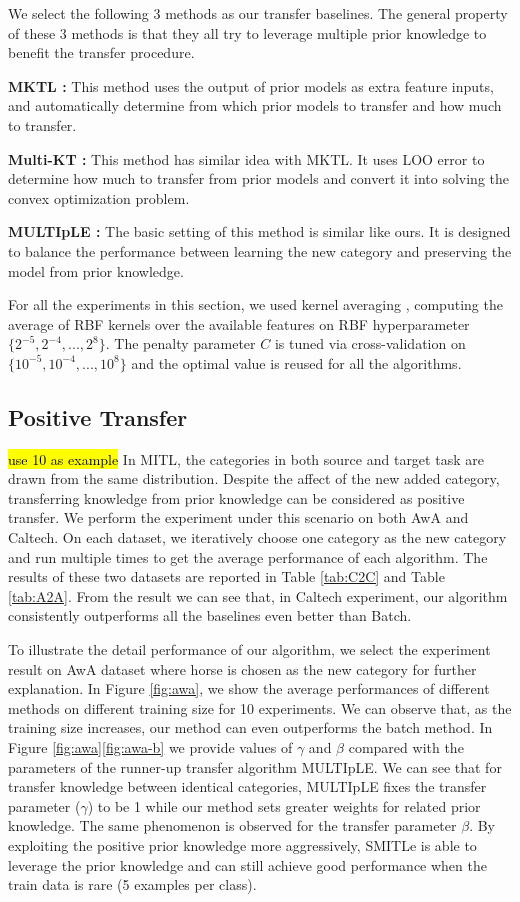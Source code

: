 We select the following 3 methods as our transfer baselines. The general property of these 3 methods is that they all try to leverage multiple prior knowledge to benefit the transfer procedure.

\textbf{MKTL \cite{jie2011multiclass}:} This method uses the output of prior models as extra feature inputs, and automatically determine from which prior models to transfer and how much to transfer.


\textbf{Multi-KT \cite{tommasi2014learning}:} This method has similar idea with MKTL. It uses LOO error to determine how much to transfer from prior models and convert it into solving the convex optimization problem.

\textbf{MULTIpLE \cite{kuzborskij2013n}:} The basic setting of this method is similar like ours. It is designed to balance the performance between learning the new category and preserving the model from prior knowledge.

For all the experiments in this section, we used kernel averaging \cite{gehler2009feature}, computing the average of RBF kernels over the available features on RBF hyperparameter $\{2^{-5},2^{-4},...,2^8\}$. The penalty parameter $C$ is tuned via cross-validation on $\{10^{-5},10^{-4},...,10^8\}$ and the optimal value is reused for all the algorithms.

\subsection{Positive Transfer}
\hl{use 10 as example}
In MITL, the categories in both source and target task are drawn from the same distribution. Despite the affect of the new added category, transferring knowledge from prior knowledge can be considered as positive transfer. We perform the experiment under this scenario on both AwA and Caltech. On each dataset, we iteratively choose one category as the new category and run multiple times to get the average performance of each algorithm. The results of these two datasets are reported in Table \ref{tab:C2C} and Table \ref{tab:A2A}. From the result we can see that, in Caltech experiment, our algorithm consistently outperforms all the baselines even better than Batch.

To illustrate the detail performance of our algorithm, we select the experiment result on AwA dataset where horse is chosen as the new category for further explanation. In Figure \ref{fig:awa}, we show the average performances of different methods on different training size for 10 experiments. We can observe that, as the training size increases, our method can even outperforms the batch method.
In Figure \ref{fig:awa}\ref{fig:awa-b} we provide values of $\gamma$ and $\beta$ compared with the parameters of the runner-up transfer algorithm MULTIpLE. We can see that for transfer knowledge between identical categories, MULTIpLE fixes the transfer parameter ($\gamma$) to be 1 while our method sets greater weights for related prior knowledge. The same phenomenon is observed for the transfer parameter $\beta$. By exploiting the positive prior knowledge more aggressively, SMITLe is able to leverage the prior knowledge and can still achieve good performance when the train data is rare (5 examples per class).


